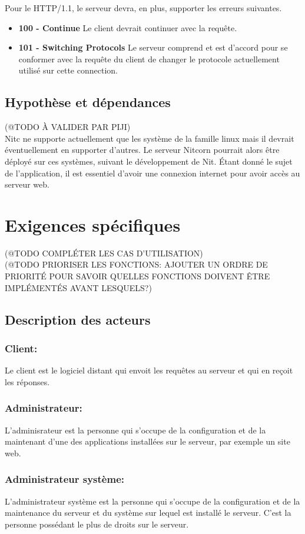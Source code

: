\documentclass{scrreprt}
\begin{document}
 Pour le HTTP/1.1, le serveur devra, en plus, supporter les erreurs suivantes.
 \begin{itemize}
 \item \textbf{100 - Continue}
 \subitem Le client devrait continuer avec la requête.
 \item \textbf{101 - Switching Protocols}
 \subitem Le serveur comprend et est d'accord pour se conformer avec la requête du client de changer le protocole actuellement utilisé sur cette connection.
 \end{itemize}
    
\section{Hypothèse et dépendances}
(@TODO À VALIDER PAR PIJI)\\
Nitc ne supporte actuellement que les système de la famille linux mais il devrait éventuellement en supporter d'autres. Le serveur Nitcorn pourrait alors être déployé sur ces systèmes, suivant le développement de Nit.
Étant donné le sujet de l'application, il est essentiel d'avoir une connexion internet pour avoir accès au serveur web.\\


\chapter{Exigences spécifiques}
(@TODO COMPLÉTER LES CAS D'UTILISATION)\\
(@TODO PRIORISER LES FONCTIONS: AJOUTER UN ORDRE DE PRIORITÉ POUR SAVOIR QUELLES FONCTIONS DOIVENT ÊTRE IMPLÉMENTÉS AVANT LESQUELS?)

\section{Description des acteurs}
\subsection{Client:} Le client est le logiciel distant qui envoit les requêtes au serveur et qui en reçoit les réponses. 
\subsection{Administrateur:} L'adminisrateur est la personne qui s'occupe de la configuration et de la maintenant d'une des applications installées sur le serveur, par exemple un site web.
\subsection{Administrateur système:} L'administrateur système est la personne qui s'occupe de la configuration et de la maintenance du serveur et du système sur lequel est installé le serveur. C'est la personne possédant le plus de droits sur le serveur.
\end{document}

